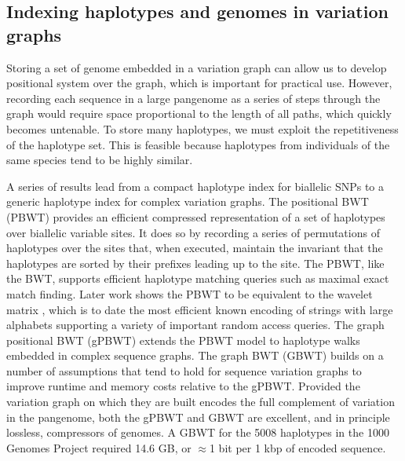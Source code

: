 \subsection{Indexing haplotypes and genomes in variation graphs}

Storing a set of genome embedded in a variation graph can allow us to develop positional system over the graph, which is important for practical use.
However, recording each sequence in a large pangenome as a series of steps through the graph would require space proportional to the length of all paths, which quickly becomes untenable.
To store many haplotypes, we must exploit the repetitiveness of the haplotype set.
This is feasible because haplotypes from individuals of the same species tend to be highly similar.


A series of results lead from a compact haplotype index for biallelic SNPs to a generic haplotype index for complex variation graphs.
The positional BWT (PBWT) \cite{Durbin_2014} provides an efficient compressed representation of a set of haplotypes over biallelic variable sites.
It does so by recording a series of permutations of haplotypes over the sites that, when executed, maintain the invariant that the haplotypes are sorted by their prefixes leading up to the site.
The PBWT, like the BWT, supports efficient haplotype matching queries such as maximal exact match finding.
Later work \cite{Gagie_2017} shows the PBWT to be equivalent to the wavelet matrix \cite{Claude_2015}, which is to date the most efficient known encoding of strings with large alphabets supporting a variety of important random access queries.
The graph positional BWT (gPBWT) \cite{Novak_2017} extends the PBWT model to haplotype walks embedded in complex sequence graphs.
The graph BWT (GBWT) \cite{siren2018haplotype} builds on a number of assumptions that tend to hold for sequence variation graphs to improve runtime and memory costs relative to the gPBWT.
Provided the variation graph on which they are built encodes the full complement of variation in the pangenome, both the gPBWT and GBWT are excellent, and in principle lossless, compressors of genomes.
A GBWT for the 5008 haplotypes in the 1000 Genomes Project required 14.6 GB, or $\approx$1 bit per 1 kbp of encoded sequence.



